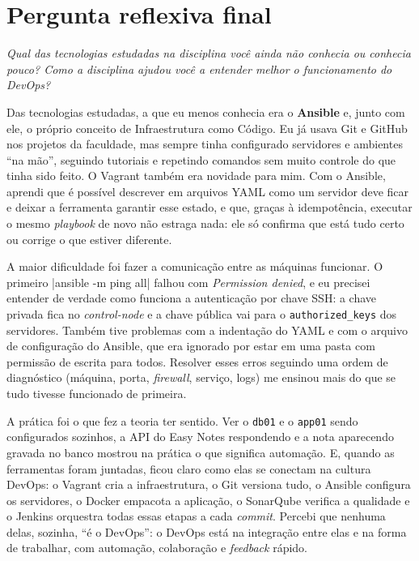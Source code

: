 \section{Pergunta reflexiva final}\label{sec:reflexao}

\begin{tcolorbox}[enhanced, colback=corprimaria!5, colframe=corprimaria, boxrule=0pt, leftrule=3pt,
    arc=0pt, outer arc=0pt, left=8pt, right=8pt, top=6pt, bottom=6pt]
  \itshape Qual das tecnologias estudadas na disciplina você ainda não conhecia ou conhecia pouco?
  Como a disciplina ajudou você a entender melhor o funcionamento do DevOps?
\end{tcolorbox}

Das tecnologias estudadas, a que eu menos conhecia era o \textbf{Ansible} e, junto com ele, o próprio
conceito de Infraestrutura como Código. Eu já usava Git e GitHub nos projetos da faculdade, mas
sempre tinha configurado servidores e ambientes ``na mão'', seguindo tutoriais e repetindo comandos
sem muito controle do que tinha sido feito. O Vagrant também era novidade para mim. Com o Ansible,
aprendi que é possível descrever em arquivos YAML como um servidor deve ficar e deixar a ferramenta
garantir esse estado, e que, graças à idempotência, executar o mesmo \textit{playbook} de novo não
estraga nada: ele só confirma que está tudo certo ou corrige o que estiver diferente.

A maior dificuldade foi fazer a comunicação entre as máquinas funcionar. O primeiro
\cod|ansible -m ping all| falhou com \textit{Permission denied}, e eu precisei entender de verdade
como funciona a autenticação por chave SSH: a chave privada fica no \textit{control-node} e a chave
pública vai para o \texttt{authorized\_keys} dos servidores. Também tive problemas com a indentação
do YAML e com o arquivo de configuração do Ansible, que era ignorado por estar em uma pasta com
permissão de escrita para todos. Resolver esses erros seguindo uma ordem de diagnóstico (máquina,
porta, \textit{firewall}, serviço, logs) me ensinou mais do que se tudo tivesse funcionado de
primeira.

A prática foi o que fez a teoria ter sentido. Ver o \texttt{db01} e o \texttt{app01} sendo
configurados sozinhos, a API do Easy Notes respondendo e a nota aparecendo gravada no banco mostrou
na prática o que significa automação. E, quando as ferramentas foram juntadas, ficou claro como elas
se conectam na cultura DevOps: o Vagrant cria a infraestrutura, o Git versiona tudo, o Ansible
configura os servidores, o Docker empacota a aplicação, o SonarQube verifica a qualidade e o Jenkins
orquestra todas essas etapas a cada \textit{commit}. Percebi que nenhuma delas, sozinha, ``é o
DevOps'': o DevOps está na integração entre elas e na forma de trabalhar, com automação, colaboração e
\textit{feedback} rápido.

